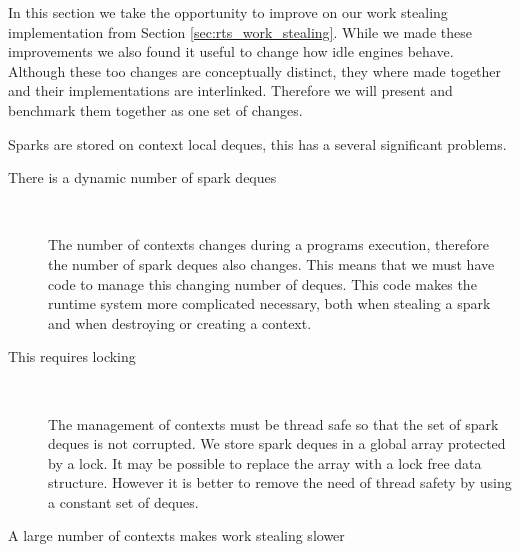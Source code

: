 

In this section we take the opportunity to improve on our work stealing
implementation from Section \ref{sec:rts_work_stealing}.
While we made these improvements we also found it useful to change how idle
engines behave.
Although these too changes are conceptually distinct,
they where made together and their implementations are interlinked.
Therefore we will present and benchmark them together as one set of changes.

Sparks are stored on context local deques,
this has a several significant problems.

\begin{description}

    \item[There is a dynamic number of spark deques]~

    The number of contexts changes during a programs execution,
    therefore the number of spark deques also changes.
    This means that we must have code to manage this changing number of
    deques.
    This code makes the runtime system more complicated necessary,
    both when stealing a spark and when destroying or creating a context.

    \item[This requires locking]~

    The management of contexts must be thread safe so that the set of
    spark deques is not corrupted.
    We store spark deques in a global array protected by a lock.
    It may be possible to replace the array with a lock free data structure.
    However it is better to remove the need of thread safety by using a
    constant set of deques.

    \item[A large number of contexts makes work stealing slower]~
    

\end{description}
